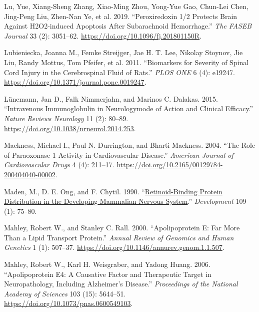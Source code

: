 \documentclass[9pt,lineno]{elife}
\newlength{\cslhangindent}
\newlength{\cslentryspacingunit} %
\newenvironment{CSLReferences}[2] %
 {%
  \setlength{\parindent}{0pt}
  \ifodd #1
  \let\oldpar\par
  \def\par{\hangindent=\cslhangindent\oldpar}
  \fi
  \setlength{\parskip}{#2\cslentryspacingunit}
 }%
 {}
\begin{document}
\begin{CSLReferences}{1}{0}
\leavevmode{}%
Lu, Yue, Xiang-Sheng Zhang, Xiao-Ming Zhou, Yong-Yue Gao, Chun-Lei Chen, Jing-Peng Liu, Zhen-Nan Ye, et al. 2019. {``Peroxiredoxin 1/2 Protects Brain Against {H2O2-induced} Apoptosis After Subarachnoid Hemorrhage.''} \emph{The FASEB Journal} 33 (2): 3051--62. \url{https://doi.org/10.1096/fj.201801150R}.

\leavevmode{}%
Lubieniecka, Joanna M., Femke Streijger, Jae H. T. Lee, Nikolay Stoynov, Jie Liu, Randy Mottus, Tom Pfeifer, et al. 2011. {``Biomarkers for {Severity} of {Spinal Cord Injury} in the {Cerebrospinal Fluid} of {Rats}.''} \emph{PLOS ONE} 6 (4): e19247. \url{https://doi.org/10.1371/journal.pone.0019247}.

\leavevmode{}%
Lünemann, Jan D., Falk Nimmerjahn, and Marinos C. Dalakas. 2015. {``Intravenous Immunoglobulin in Neurology\textemdash mode of Action and Clinical Efficacy.''} \emph{Nature Reviews Neurology} 11 (2): 80--89. \url{https://doi.org/10.1038/nrneurol.2014.253}.

\leavevmode{}%
Mackness, Michael I., Paul N. Durrington, and Bharti Mackness. 2004. {``The {Role} of {Paraoxonase} 1 {Activity} in {Cardiovascular Disease}.''} \emph{American Journal of Cardiovascular Drugs} 4 (4): 211--17. \url{https://doi.org/10.2165/00129784-200404040-00002}.

\leavevmode{}%
Maden, M., D. E. Ong, and F. Chytil. 1990. {``\href{https://www.ncbi.nlm.nih.gov/pubmed/2170099}{Retinoid-Binding Protein Distribution in the Developing Mammalian Nervous System}.''} \emph{Development} 109 (1): 75--80.

\leavevmode{}%
Mahley, Robert W., and Stanley C. Rall. 2000. {``Apolipoprotein {E}: {Far More Than} a {Lipid Transport Protein}.''} \emph{Annual Review of Genomics and Human Genetics} 1 (1): 507--37. \url{https://doi.org/10.1146/annurev.genom.1.1.507}.

\leavevmode{}%
Mahley, Robert W., Karl H. Weisgraber, and Yadong Huang. 2006. {``Apolipoprotein {E4}: {A} Causative Factor and Therapeutic Target in Neuropathology, Including {Alzheimer}'s Disease.''} \emph{Proceedings of the National Academy of Sciences} 103 (15): 5644--51. \url{https://doi.org/10.1073/pnas.0600549103}.


\end{CSLReferences}
\end{document}
